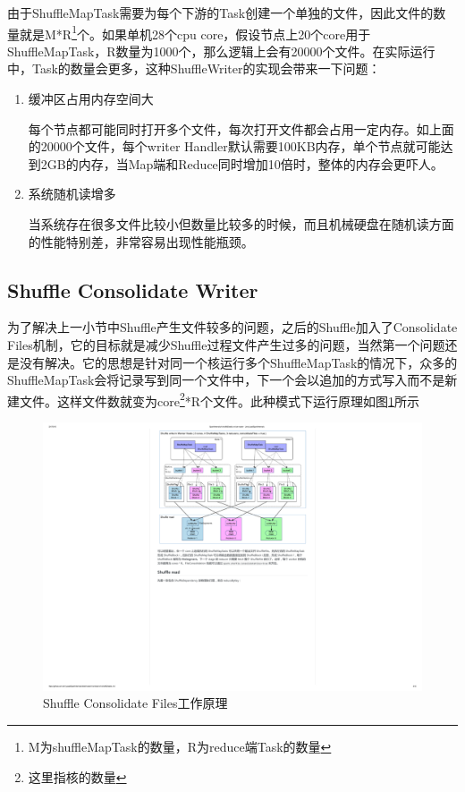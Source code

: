 由于ShuffleMapTask需要为每个下游的Task创建一个单独的文件，因此文件的数量就是M*R\footnote{M为shuffleMapTask的数量，R为reduce端Task的数量}个。如果单机28个cpu core，假设节点上20个core用于ShuffleMapTask，R数量为1000个，那么逻辑上会有20000个文件。在实际运行中，Task的数量会更多，这种ShuffleWriter的实现会带来一下问题：
\begin{enumerate}[\bfseries 1]
	\item 缓冲区占用内存空间大
	
	每个节点都可能同时打开多个文件，每次打开文件都会占用一定内存。如上面的20000个文件，每个writer Handler默认需要100KB内存，单个节点就可能达到2GB的内存，当Map端和Reduce同时增加10倍时，整体的内存会更吓人。
	\item 系统随机读增多
	
	当系统存在很多文件比较小但数量比较多的时候，而且机械硬盘在随机读方面的性能特别差，非常容易出现性能瓶颈。
\end{enumerate}
\subsection{Shuffle Consolidate Writer}

为了解决上一小节中Shuffle产生文件较多的问题，之后的Shuffle加入了Consolidate Files机制，它的目标就是减少Shuffle过程文件产生过多的问题，当然第一个问题还是没有解决。它的思想是针对同一个核运行多个ShuffleMapTask的情况下，众多的ShuffleMapTask会将记录写到同一个文件中，下一个会以追加的方式写入而不是新建文件。这样文件数就变为core\footnote{这里指核的数量}*R个文件。此种模式下运行原理如图\ref{fig:consolidate}所示
\begin{figure}[H] 
	\centering
	\includegraphics[width=\textwidth]{figures/consolidate.pdf}
	\caption{Shuffle Consolidate Files工作原理}
	\label{fig:consolidate}
\end{figure}

